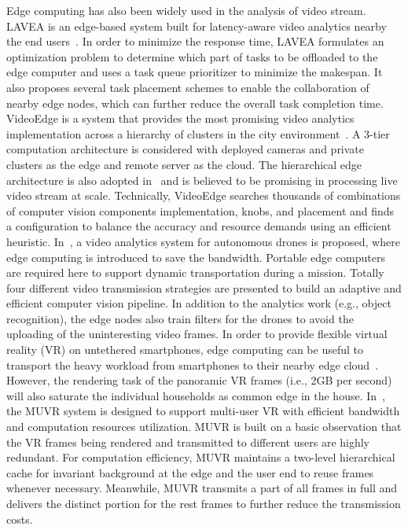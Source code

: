 Edge computing has also been widely used in the analysis of video stream. LAVEA is an edge-based system built for latency-aware video analytics nearby the end users~. In order to minimize the response time, LAVEA formulates an optimization problem to determine which part of tasks to be offloaded to the edge computer and uses a task queue prioritizer to minimize the makespan. It also proposes several task placement schemes to enable the collaboration of nearby edge nodes, which can further reduce the overall task completion time. VideoEdge is a system that provides the most promising video analytics implementation across a hierarchy of clusters in the city environment~. A 3-tier computation architecture is considered with deployed cameras and private clusters as the edge and remote server as the cloud. The hierarchical edge architecture is also adopted in~ and is believed to be promising in processing live video stream at scale. Technically, VideoEdge searches thousands of combinations of computer vision components implementation, knobs, and placement and finds a configuration to balance the accuracy and resource demands using an efficient heuristic. In~, a video analytics system for autonomous drones is proposed, where edge computing is introduced to save the bandwidth. Portable edge computers are required here to support dynamic transportation during a mission. Totally four different video transmission strategies are presented to build an adaptive and efficient computer vision pipeline. In addition to the analytics work (e.g., object recognition), the edge nodes also train filters for the drones to avoid the uploading of the uninteresting video frames.
In order to provide flexible virtual reality (VR) on untethered smartphones, edge computing can be useful to transport the heavy workload from smartphones to their nearby edge cloud~. However, the rendering task of the panoramic VR frames (i.e., 2GB per second) will also saturate the individual households as common edge in the house. In~, the MUVR system is designed to support multi-user VR with efficient bandwidth and computation resources utilization. MUVR is built on a basic observation that the VR frames being rendered and transmitted to different users are highly redundant. For computation efficiency, MUVR maintains a two-level hierarchical cache for invariant background at the edge and the user end to reuse frames whenever necessary. Meanwhile, MUVR transmits a part of all frames in full and delivers the distinct portion for the rest frames to further reduce the transmission costs.
